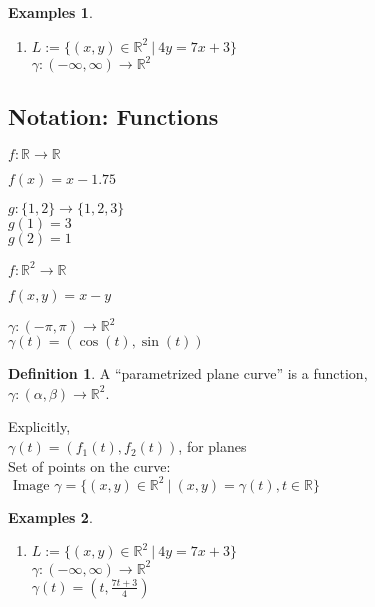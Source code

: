 \documentclass[twocolumn,20pt,fleqn]{extarticle}
\newcommand{\sep}{\vspace{0.5cm}}
\theoremstyle{plain}
\theoremstyle{definition}
\newtheorem*{definition}{Definition}
\newtheorem*{exmpls}{Examples}
\theoremstyle{remark}
\newenvironment*{examples}{\begin{exmpls} ~ \begin{enumerate}}{\end{enumerate}\end{exmpls}}
\begin{document}
\begin{examples}
  \item $L:=\{(x,y) \in \mathbb{R}^2\ |\ 4y = 7x + 3\}$\\
  $\gamma  : (-\infty,\infty) \to \mathbb{R}^2$ \end{examples}


\clearpage




\subsection{Notation: Functions}

$ f: \mathbb{R}  \to \mathbb{R}$

$f(x) = x - 1.75$\\

\sep

  $g : \{1,2\} \to \{1,2,3\}$\\
    $g(1) = 3$\\
    $g(2) = 1$\\

\sep

$ f: \mathbb{R}^2  \to \mathbb{R}$

$f(  x,y  ) = x - y$


\sep

$\gamma :  (-\pi,\pi)  \to \mathbb{R}^2$\\
$\gamma(t) = (\cos(t), \sin(t))$



\newpage



\begin{definition}
  A  ``parametrized plane curve''  is a  function,\\ $\gamma  : (\alpha, \beta) \to \mathbb{R}^2$.
\end{definition}

Explicitly,\\
$\gamma(t) = (f_1(t), f_2(t))$, for planes\\

Set of points on the curve:\\  $\textrm{ Image } \gamma = \{(x,y) \in \mathbb{R}^2 \ |\ (x,y) = \gamma(t), t \in \mathbb{R}\}$




\begin{examples}
  \item $L:=\{(x,y) \in \mathbb{R}^2\ |\ 4y = 7x + 3\}$\\
  $\gamma  : (-\infty,\infty) \to \mathbb{R}^2$ \\
  $\gamma(t) = (t, \frac{7t+3}{4}) $\end{examples}
\end{document}

